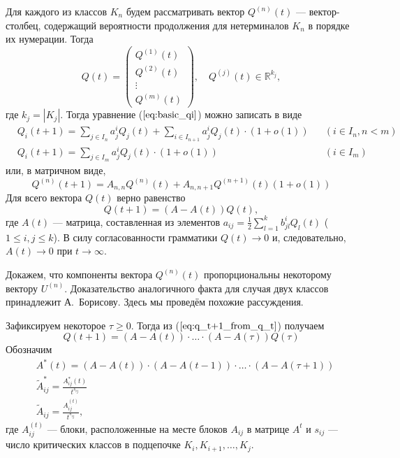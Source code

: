 \documentclass[12pt]{article}
\renewcommand{\leq}{\leqslant}
\renewcommand{\geq}{\geqslant}
\begin{document}
Для каждого из классов $K_n$ будем рассматривать вектор $Q^{(n)}(t)$ --- вектор-столбец, содержащий вероятности продолжения для нетерминалов $K_n$ в порядке их нумерации. Тогда
\begin{equation}
	Q(t) =
	\begin{pmatrix}
		Q^{(1)}(t) \\
		Q^{(2)}(t) \\
		\vdots \\
		Q^{(m)}(t)
	\end{pmatrix},
	\quad Q^{(j)}(t) \in \mathbb{R}^{k_j},
\end{equation}
где $k_j = \left| K_j \right|$. Тогда уравнение ($\ref{eq:basic_qi}$) можно записать в виде
\begin{align}
	&Q_i(t+1) = \sum_{j \in I_n} a^i_j Q_j(t) + \sum_{i \in I_{n+1}} a^i_j Q_j(t) \cdot (1 + o(1)) & &(i \in I_n, n < m) \\
	&Q_i(t+1) = \sum_{j \in I_m} a^i_j Q_j(t) \cdot (1 + o(1)) & &(i \in I_m)
\end{align}
или, в матричном виде,
\begin{equation}
	Q^{(n)}(t+1) = A_{n,n} Q^{(n)}(t) + A_{n,n+1} Q^{(n+1)}(t) (1 + o(1))
\end{equation}
Для всего вектора $Q(t)$ верно равенство
\begin{equation}
\label{eq:q_t+1_from_q_t}
	Q(t+1) = (A - A(t)) Q(t),
\end{equation}
где $A(t)$ --- матрица, составленная из элементов $a_{ij} = \frac{1}{2} \sum_{l = 1}^k b^i_{jl} Q_l(t)$ ($1 \leq i,j \leq k$). В силу согласованности грамматики $Q(t) \rightarrow 0$ и, следовательно, $A(t) \rightarrow 0$ при $t \rightarrow \infty$.

Докажем, что компоненты вектора $Q^{(n)}(t)$ пропорциональны некоторому вектору $U^{(n)}$. Доказательство аналогичного факта для случая двух классов принадлежит А.~Борисову. Здесь мы проведём похожие рассуждения.

Зафиксируем некоторое $\tau \geq 0$. Тогда из ($\ref{eq:q_t+1_from_q_t}$) получаем
\begin{equation}
\label{eq:q_t+1_from_q_tau}
	Q(t+1) = (A - A(t)) \cdot \ldots \cdot (A - A(\tau)) Q(\tau)
\end{equation}
Обозначим
\begin{equation}
	\begin{split}
		&A^*(t) = (A - A(t)) \cdot (A - A(t-1)) \cdot \ldots \cdot (A - A(\tau + 1)) \\
		&\tilde{A}^*_{ij} = \frac{A^*_{ij}(t)}{t^{s_{ij}}} \\
		&\tilde{A}_{ij} = \frac{A^{(t)}_{ij}}{t^{s_{ij}}},
	\end{split}
\end{equation}
где $A^{(t)}_{ij}$ --- блоки, расположенные на месте блоков $A_{ij}$ в матрице $A^t$ и $s_{ij}$ --- число критических классов в подцепочке $K_i, K_{i+1}, \ldots, K_j$.
\end{document}
